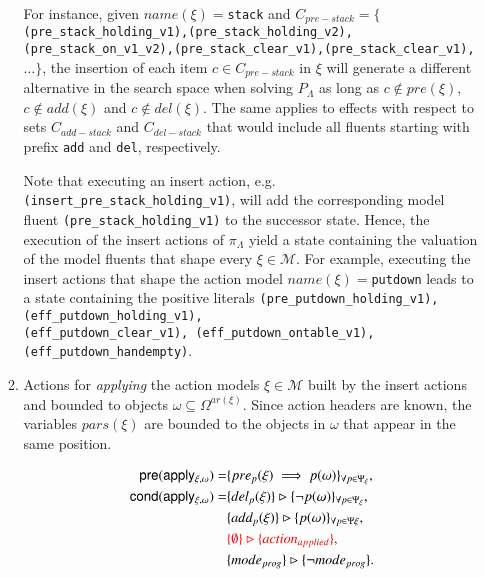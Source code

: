 \begin{itemize}
\begin{enumerate}
For instance, given $name(\xi)=${\tt{\small stack}} and $C_{pre-stack}=\{${\tt{\small (pre\_stack\_holding\_v1),(pre\_stack\_holding\_v2), (pre\_stack\_on\_v1\_v2),(pre\_stack\_clear\_v1),(pre\_stack\_clear\_v1),}}$\ldots \}$, the insertion of each item $c \in C_{pre-stack}$ in $\xi$ will generate a different alternative in the search space when solving $P_{\Lambda}$ as long as $c \notin pre(\xi)$,  $c \notin add(\xi)$ and $c \notin del(\xi)$. The same applies to effects with respect to sets $C_{add-stack}$ and $C_{del-stack}$ that would include all fluents starting with prefix  {\tt{\small add}} and {\tt{\small del}}, respectively.

\vspace{0.1cm}

Note that executing an insert action, e.g.{\tt{\small (insert\_pre\_stack\_holding\_v1)}}, will add the corresponding model fluent {\tt{\small (pre\_stack\_holding\_v1)}} to the successor state. Hence, the execution of the insert actions of $\pi_\Lambda$ yield a state containing the valuation of the model fluents that shape every $\xi \in \mathcal{M}$. For example, executing the insert actions that shape the action model $name(\xi)=${\tt{\small putdown}} leads to a state containing the positive literals {\tt{\small (pre\_putdown\_holding\_v1),(eff\_putdown\_holding\_v1),\\ (eff\_putdown\_clear\_v1),
(eff\_putdown\_ontable\_v1),(eff\_putdown\_handempty)}}.

\item Actions for {\em applying} the action models $\xi\in\mathcal{M}$ built by the insert actions and bounded to objects $\omega\subseteq\Omega^{ar(\xi)}$. Since action headers are known, the variables $pars(\xi)$ are bounded to the objects in $\omega$ that appear in the same position.


\begin{small}
\begin{align*}
\hspace*{7pt}\mathsf{pre}(\mathsf{apply_{\xi,\omega}})=&\{pre_{p}(\xi)\implies p(\omega)\}_{\forall p\in\Psi_\xi},\\
\mathsf{cond}(\mathsf{apply_{\xi,\omega}})=&\{del_{p}(\xi)\}\rhd\{\neg p(\omega)\}_{\forall p\in\Psi_\xi},\\
&\{add_{p}(\xi)\}\rhd\{p(\omega)\}_{\forall p\in\Psi\xi},\\
& \textcolor{red}{\{\emptyset\}\rhd\{action_{applied}\},}\\
&\{mode_{prog}\}\rhd\{\neg mode_{prog}\}.
\end{align*}
\end{small}


\end{enumerate}
\end{itemize}
